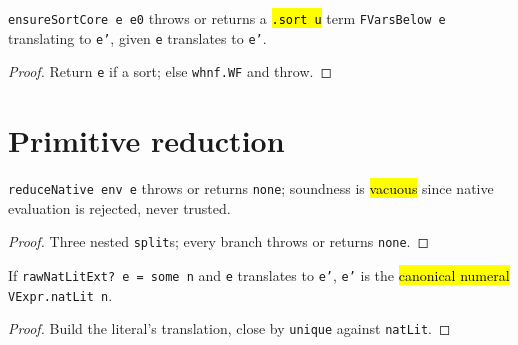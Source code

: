 \begin{lemma}
  \label{thm:vtc-ensuresortcore}
  \leanok

   \texttt{ensureSortCore e e0} throws or returns a \hl{\texttt{.sort u}} term
  \texttt{FVarsBelow e} translating to \texttt{e'}, given \texttt{e} translates to \texttt{e'}.
\end{lemma}
\begin{proof}
  \leanok
   Return \texttt{e} if a sort; else \texttt{whnf.WF} and throw.
\end{proof}

\section{Primitive reduction}

\begin{lemma}
  \label{thm:vtc-reducenative}
  \leanok

   \texttt{reduceNative env e} throws or returns \texttt{none}; soundness is
  \hl{vacuous} since native evaluation is rejected, never trusted.
\end{lemma}
\begin{proof}
  \leanok
   Three nested \texttt{split}s; every branch throws or returns \texttt{none}.
\end{proof}

\begin{lemma}
  \label{thm:vtc-rawnatlit}
  \leanok

   If \texttt{rawNatLitExt? e = some n} and \texttt{e} translates to \texttt{e'},
  \texttt{e'} is the \hl{canonical numeral} \texttt{VExpr.natLit n}.
\end{lemma}
\begin{proof}
  \leanok
   Build the literal's translation, close by \texttt{unique} against \texttt{natLit}.
\end{proof}

